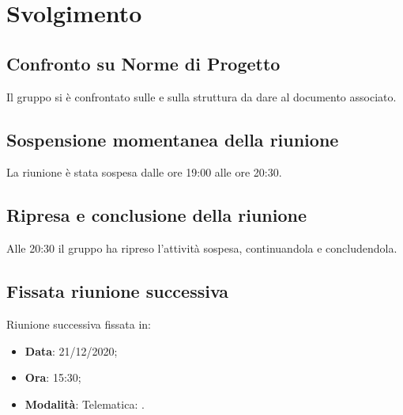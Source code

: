 \documentclass[]{article}
\begin{document}
	\newpage

	\section{Svolgimento}
		\subsection{Confronto su Norme di Progetto}
		Il gruppo si è confrontato sulle  e sulla struttura da dare al documento associato.\\

		\subsection{Sospensione momentanea della riunione}
		La riunione è stata sospesa dalle ore 19:00 alle ore 20:30.\\
		
		\subsection{Ripresa e conclusione della riunione}
		Alle 20:30 il gruppo ha ripreso l'attività sospesa, continuandola e concludendola.\\

		\subsection{Fissata riunione successiva}
		Riunione successiva fissata in:
		\begin{itemize}
			\item \textbf{Data}: 21/12/2020;
			\item \textbf{Ora}: 15:30;
			\item \textbf{Modalità}: Telematica: .
		\end{itemize}

	
\end{document}
